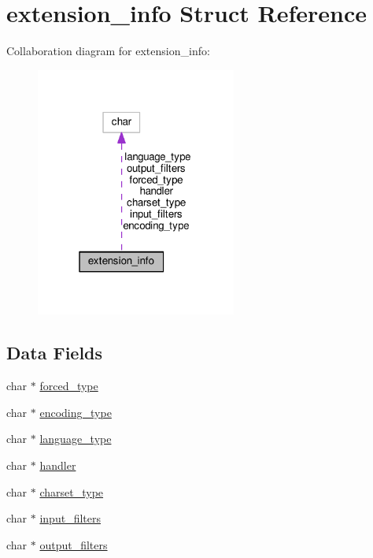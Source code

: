 \hypertarget{structextension__info}{}\section{extension\+\_\+info Struct Reference}
\label{structextension__info}


Collaboration diagram for extension\+\_\+info\+:
\nopagebreak
\begin{figure}[H]
\begin{center}
\leavevmode
\includegraphics[width=187pt]{structextension__info__coll__graph}
\end{center}
\end{figure}
\subsection*{Data Fields}
\begin{DoxyCompactItemize}
\item 
char $\ast$ \hyperlink{structextension__info_a37c1c2a26c9ca95cab1ddb7ce9bb1f31}{forced\+\_\+type}
\item 
char $\ast$ \hyperlink{structextension__info_a900a82a7462dc23e48120bedbe97b463}{encoding\+\_\+type}
\item 
char $\ast$ \hyperlink{structextension__info_a697c3df1f8e026ca53b1b6d527ceb578}{language\+\_\+type}
\item 
char $\ast$ \hyperlink{structextension__info_a9ecbc17ccf71547ccf62747c739a3ed4}{handler}
\item 
char $\ast$ \hyperlink{structextension__info_a547339c0cbccc677be670918128829b5}{charset\+\_\+type}
\item 
char $\ast$ \hyperlink{structextension__info_a0aeaf3b4d1169fd14217669d33635cc8}{input\+\_\+filters}
\item 
char $\ast$ \hyperlink{structextension__info_a6339e20781569df817ade3c4e17c68f0}{output\+\_\+filters}
\end{DoxyCompactItemize}


